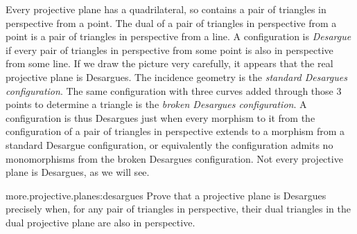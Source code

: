 
Every projective plane has a quadrilateral, so contains a pair of triangles in perspective from a point.
The dual of a pair of triangles in perspective from a point is a pair of triangles in perspective from a line.
A configuration is \emph{Desargue} if every pair of triangles in perspective from some point is also in perspective from some line.
If we draw the picture very carefully, it appears that the real projective plane is Desargues.
The incidence geometry
is the \emph{standard Desargues configuration}.
The same configuration with three curves added through those 3 points to determine a triangle is the \emph{broken Desargues configuration}.
A configuration is thus Desargues just when every morphism to it from the configuration of a pair of triangles in perspective extends to a morphism from a standard Desargue configuration, or equivalently the configuration admits no monomorphisms from the broken Desargues configuration.
Not every projective plane is Desargues, as we will see.
\endgroup
 
\begin{problem}{more.projective.planes:desargues}
Prove that a projective plane is Desargues precisely when, for any pair of triangles in perspective, their dual triangles in the dual projective plane are also in perspective.
\end{problem}
 
